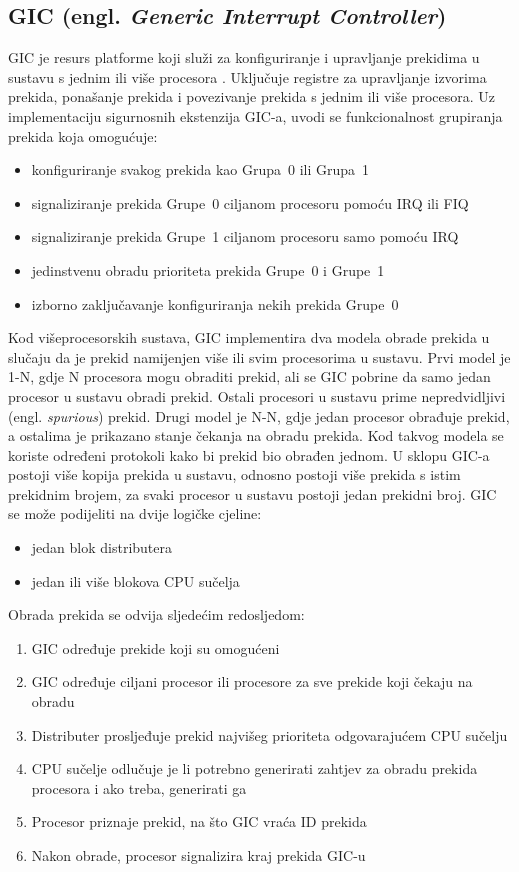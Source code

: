 \documentclass[times, utf8, diplomski, numeric]{fer}
\begin{document}
\subsection{GIC (engl. \textit{Generic Interrupt Controller})}
GIC je resurs platforme koji služi za konfiguriranje i upravljanje prekidima u sustavu s jednim ili više procesora
\cite{gic}.
Uključuje registre za upravljanje izvorima prekida, ponašanje prekida i povezivanje prekida s jednim ili više
procesora. Uz implementaciju sigurnosnih ekstenzija GIC-a, uvodi se funkcionalnost grupiranja prekida koja omogućuje:
\begin{itemize}
  \item{konfiguriranje svakog prekida kao Grupa~0 ili Grupa~1}
  \item{signaliziranje prekida Grupe~0 ciljanom procesoru pomoću IRQ ili FIQ}
  \item{signaliziranje prekida Grupe~1 ciljanom procesoru samo pomoću IRQ}
  \item{jedinstvenu obradu prioriteta prekida Grupe~0 i Grupe~1}
  \item{izborno zaključavanje konfiguriranja nekih prekida Grupe~0}
\end{itemize}
Kod višeprocesorskih sustava, GIC implementira dva modela obrade prekida u slučaju da je prekid namijenjen više
ili svim procesorima u sustavu. Prvi model je 1-N, gdje N procesora mogu obraditi prekid, ali se GIC pobrine da samo
jedan procesor u sustavu obradi prekid. Ostali procesori u sustavu prime nepredvidljivi (engl. \textit{spurious}) prekid.
Drugi model je N-N, gdje jedan procesor obrađuje prekid, a ostalima je prikazano stanje čekanja na obradu prekida.
Kod takvog modela se koriste određeni protokoli kako bi prekid bio obrađen jednom. U sklopu GIC-a postoji više kopija
prekida u sustavu, odnosno postoji više prekida s istim prekidnim brojem, za svaki procesor u sustavu postoji jedan prekidni
broj. GIC se može podijeliti na dvije logičke cjeline:
\begin{itemize}
  \item{jedan blok distributera}
  \item{jedan ili više blokova CPU sučelja}
\end{itemize}
Obrada prekida se odvija sljedećim redosljedom:
\begin{enumerate}
  \item{GIC određuje prekide koji su omogućeni}
  \item{GIC određuje ciljani procesor ili procesore za sve prekide koji čekaju na obradu}
  \item{Distributer prosljeđuje prekid najvišeg prioriteta odgovarajućem CPU sučelju}
  \item{CPU sučelje odlučuje je li potrebno generirati zahtjev za obradu prekida procesora i ako treba, generirati ga}
  \item{Procesor priznaje prekid, na što GIC vraća ID prekida}
  \item{Nakon obrade, procesor signalizira kraj prekida GIC-u}
\end{enumerate}
\end{document}
